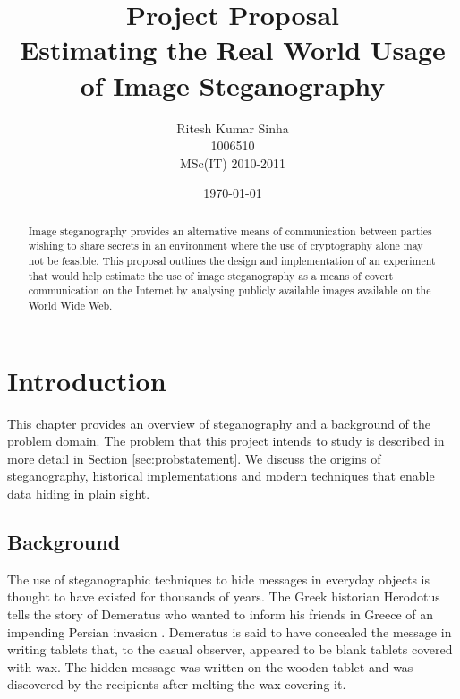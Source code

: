 \documentclass[12pt]{extreport}
\begin{document}
\title{Project Proposal\\ \huge{Estimating the Real World Usage of Image Steganography }}
\author{Ritesh Kumar Sinha\\ 1006510\\MSc(IT) 2010-2011}

\date{\today}

\maketitle
\begin{abstract}
Image steganography provides an alternative means of communication between parties wishing to share secrets in an environment where the use of cryptography alone may not be feasible.  This proposal outlines the design and implementation of an experiment  that would help estimate the use of image steganography as a means of covert communication on the Internet by analysing publicly available images available on the World Wide Web.      
\end{abstract}
\tableofcontents





\chapter{Introduction}
\label{ch:intro}
This chapter provides an overview of steganography and a background of the problem domain. The problem that this project intends to study is described in more detail in Section \ref{sec:probstatement}. We discuss the origins of steganography, historical implementations and modern techniques that enable data hiding in plain sight. 
\section{Background}
The use of steganographic techniques to hide messages in everyday objects is thought to have existed for thousands of years. The Greek historian Herodotus tells the story of Demeratus who wanted to inform his friends in Greece of an impending Persian invasion  \cite{kahn1996history}. Demeratus is said to have concealed the message in writing tablets that, to the casual observer, appeared to be blank tablets covered with wax. The hidden message was written on the wooden tablet and was discovered by the recipients after melting the wax covering it.   
\end{document}
